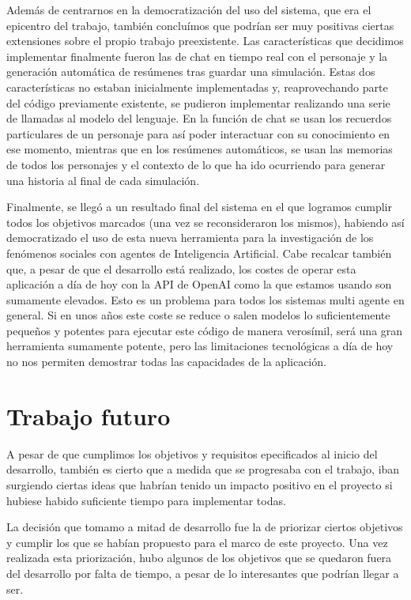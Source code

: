 Además de centrarnos en la democratización del uso del sistema, que era el epicentro del trabajo, también concluímos que podrían ser muy positivas ciertas extensiones sobre el propio trabajo preexistente. Las características que decidimos implementar finalmente fueron las de chat en tiempo real con el personaje y la generación automática de resúmenes tras guardar una simulación. Estas dos características no estaban inicialmente implementadas y, reaprovechando parte del código previamente existente, se pudieron implementar realizando una serie de llamadas al modelo del lenguaje. En la función de chat se usan los recuerdos particulares de un personaje para así poder interactuar con su conocimiento en ese momento, mientras que en los resúmenes automáticos, se usan las memorias de todos los personajes y el contexto de lo que ha ido ocurriendo para generar una historia al final de cada simulación.

Finalmente, se llegó a un resultado final del sistema en el que logramos cumplir todos los objetivos marcados (una vez se reconsideraron los mismos), habiendo así democratizado el uso de esta nueva herramienta para la investigación de los fenómenos sociales con agentes de Inteligencia Artificial. Cabe recalcar también que, a pesar de que el desarrollo está realizado, los costes de operar esta aplicación a día de hoy con la API de OpenAI como la que estamos usando son sumamente elevados. Esto es un problema para todos los sistemas multi agente en general. Si en unos años este coste se reduce o salen modelos lo suficientemente pequeños y potentes para ejecutar este código de manera verosímil, será una gran herramienta sumamente potente, pero las limitaciones tecnológicas a día de hoy no nos permiten demostrar todas las capacidades de la aplicación.

\section{Trabajo futuro}

A pesar de que cumplimos los objetivos y requisitos epecificados al inicio del desarrollo, también es cierto que a medida que se progresaba con el trabajo, iban surgiendo ciertas ideas que habrían tenido un impacto positivo en el proyecto si hubiese habido suficiente tiempo para implementar todas.

La decisión que tomamo a mitad de desarrollo fue la de priorizar ciertos objetivos y cumplir los que se habían propuesto para el marco de este proyecto. Una vez realizada esta priorización, hubo algunos de los objetivos que se quedaron fuera del desarrollo por falta de tiempo, a pesar de lo interesantes que podrían llegar a ser.

